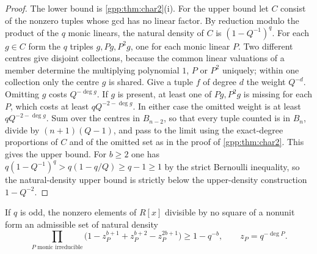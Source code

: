 \begin{proof}
The lower bound is \cref{gpp:thm:char2}(i). For the upper bound let $C$ consist of the
nonzero tuples whose gcd has no linear factor. By reduction modulo the product of the $q$
monic linears, the natural density of $C$ is $(1-Q^{-1})^q$. For each $g\in C$ form the
$q$ triples $g,Pg,P^2g$, one for each monic linear $P$. Two different centres give
disjoint collections, because the common linear valuations of a member determine the
multiplying polynomial $1$, $P$ or $P^2$ uniquely; within one collection only the centre
$g$ is shared. Give a tuple $f$ of degree $d$ the weight $Q^{-d}$. Omitting $g$ costs
$Q^{-\deg g}$. If $g$ is present, at least one of $Pg,P^2g$ is missing for each $P$,
which costs at least $qQ^{-2-\deg g}$. In either case the omitted weight is at least
$qQ^{-2-\deg g}$. Sum over the centres in $B_{n-2}$, so that every tuple counted is in
$B_n$, divide by $(n+1)(Q-1)$, and pass to the limit using the exact-degree proportions
of $C$ and of the omitted set as in the proof of \cref{gpp:thm:char2}. This gives the
upper bound. For $b\ge2$ one has $q(1-Q^{-1})^q>q(1-q/Q)\ge q-1\ge1$ by the strict
Bernoulli inequality, so the natural-density upper bound is strictly below the
upper-density construction $1-Q^{-2}$.
\end{proof}

\begin{theorem}\label{gpp:thm:oddnatural}
If $q$ is odd, the nonzero elements of $R[x]$ divisible by no square of a nonunit form an
admissible set of natural density
\begin{equation}\label{gpp:eq:localringodd}
 \prod_{P\text{ monic irreducible}}
 \bigl(1-z_P^{b+1}+z_P^{b+2}-z_P^{2b+1}\bigr)\ge1-q^{-b},\qquad z_P=q^{-\deg P}.
\end{equation}
\end{theorem}

